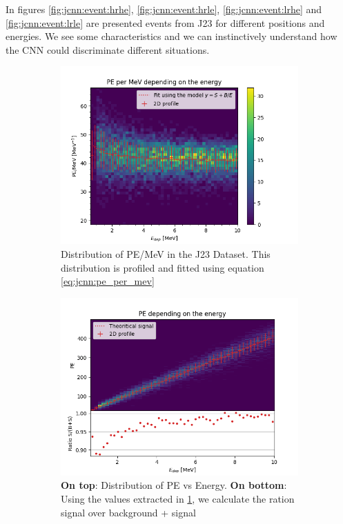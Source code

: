 \documentclass[../main.tex]{subfiles}
\begin{document}
In figures \ref{fig:jcnn:event:hrhe}, \ref{fig:jcnn:event:hrle}, \ref{fig:jcnn:event:lrhe} and \ref{fig:jcnn:event:lrle} are presented events from J23 for different positions and energies. We see some characteristics and we can instinctively understand how the CNN could discriminate different situations.

\begin{figure}[ht]
  \begin{subfigure}[t]{0.48\linewidth}
    \centering
    \includegraphics[width=\textwidth]{images/jcnn/pe_mev.png}
    \caption{Distribution of PE/MeV in the J23 Dataset. This distribution is profiled and fitted using equation \ref{eq:jcnn:pe_per_mev}}
    \label{fig:jcnn:pe_per_mev}
  \end{subfigure}
  \hfill
  \begin{subfigure}[t]{0.48\linewidth}
    \centering
    \includegraphics[width=\textwidth]{images/jcnn/pe_vs_mev.png}
    \caption{\textbf{On top}: Distribution of PE vs Energy. \textbf{On bottom}: Using the values extracted in \ref{fig:jcnn:pe_per_mev}, we calculate the ration signal over background + signal}
    \label{fig:jcnn:pe_vs_mev}
  \end{subfigure}
  \caption{}
\end{figure}
\end{document}
